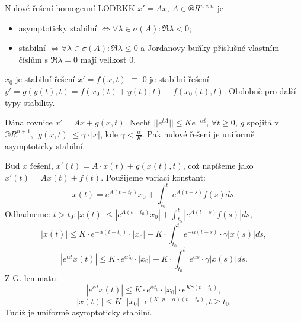 \documentclass[12pt]{article}					%
\begin{document}
\begin{veta}
	Nulové řešení homogenní LODRKK $x' = Ax$, $A \in ®R^{n \times n}$ je
	\begin{itemize}
		\item asymptoticky stabilní $\Leftrightarrow \forall \lambda \in \sigma(A): \Re \lambda < 0$;
		\item stabilní $\Leftrightarrow \forall \lambda \in \sigma(A): \Re \lambda ≤ 0$ a Jordanovy buňky příslušné vlastním číslům s $\Re \lambda = 0$ mají velikost 0.
	\end{itemize}
\end{veta}

\begin{definice}
	$x_0$ je stabilní řešení $x' = f(x, t)$ $≡$ $0$ je stabilní řešení $y' = g(y(t), t) = f(x_0(t) + y(t), t) - f(x_0(t), t)$. Obdobně pro další typy stability.
\end{definice}

\begin{lemma}
	Dána rovnice $x' = Ax + g(x, t)$. Nechť $||e^{t A}|| ≤ K e^{- \alpha t}$, $\forall t ≥ 0$, $g$ spojitá v $®R^{n + 1}$, $|g(x, t)| ≤ \gamma·|x|$, kde $\gamma < \frac{\alpha}{K}$. Pak nulové řešení je uniformě asymptoticky stabilní.

	\begin{dukazin}
		Buď $x$ řešení, $x'(t) = A·x(t) + g(x(t), t)$, což napíšeme jako $x'(t) = Ax(t) + f(t)$. Použijeme variaci konstant:
		$$ x(t) = e^{A(t - t_0)} x_0 + \int_{t_0}^t e^{A(t - s)} f(s) ds. $$
		Odhadneme: $t > t_0: |x(t)| ≤ |e^{A(t - t_0)}x_0| + \int_{t_0}^t |e^{A(t - s)} f(s)| ds$,
		$$ |x(t)| ≤ K·e^{-\alpha(t - t_0)}·|x_0| + K·\int_{t_0}^t e^{-\alpha (t - s)} ·\gamma |x(s)| ds, $$
		$$ |e^{\alpha t}x(t)| ≤ K·e^{\alpha t_0}·|x_0| + K·\int_{t_0}^t e^{\alpha s} ·\gamma |x(s)| ds. $$
		Z G. lemmatu:
		$$ |e^{\alpha t} x(t)| ≤ K·e^{\alpha t_0}·|x_0|·e^{K \gamma(t - t_0)}, $$
		$$ |x(t)| ≤ K·|x_0|·e^{(K·y - \alpha)(t - t_0)}, t ≥ t_0. $$
		Tudíž je uniformě asymptoticky stabilní.
	\end{dukazin}
\end{lemma}
\end{document}
